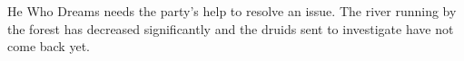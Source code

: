 He Who Dreams needs the party's help to resolve an issue.
The river running by the forest has decreased significantly and the druids sent to investigate have not come back yet.
